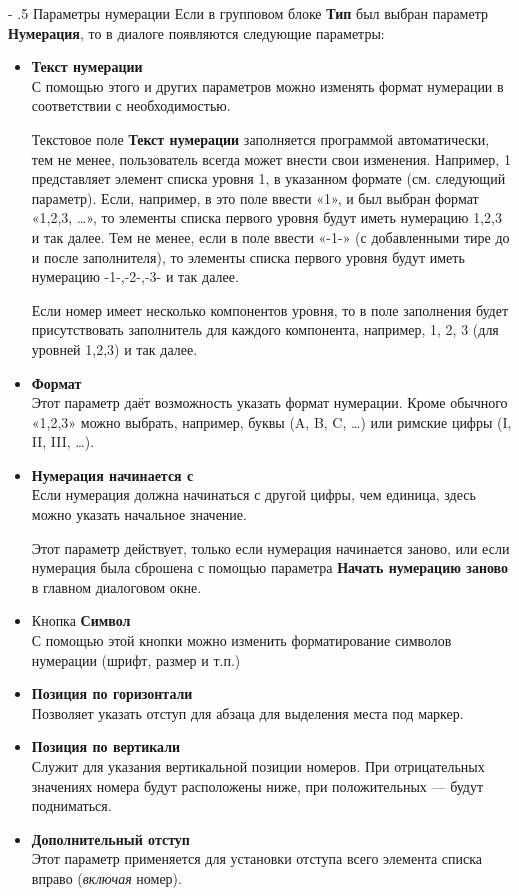 ﻿\documentclass[a4paper,10pt]{article}
\makeatletter
\renewcommand\paragraph{%
   \@startsection{paragraph}{4}{0mm}%
      {-\baselineskip}%
      {.5\baselineskip}%
      {\normalfont\normalsize\bfseries}}
\makeatother
\begin{document}
\paragraph{Параметры нумерации}
Если в групповом блоке \textbf{Тип} был выбран параметр \textbf{Нумерация}, то в диалоге появляются следующие параметры:
\begin{itemize}
 \item \textbf{Текст нумерации}\\
 С помощью этого и других параметров можно изменять формат нумерации в соответствии с необходимостью.
 
 Текстовое поле \textbf{Текст нумерации} заполняется программой автоматически, тем не менее, пользователь всегда может внести свои изменения. Например, {1} представляет элемент списка уровня 1, в указанном формате (см. следующий параметр). Если, например, в это поле ввести «{1}», и был выбран формат «1,2,3, …», то элементы списка первого уровня будут иметь нумерацию 1,2,3 и так далее. Тем не менее, если в поле ввести «-{1}-» (с добавленными тире до и после заполнителя), то элементы списка первого уровня будут иметь нумерацию -1-,-2-,-3- и так далее.
 
 Если номер имеет несколько компонентов уровня, то в поле заполнения будет присутствовать заполнитель для каждого компонента, например, {1}, {2}, {3} (для уровней 1,2,3) и так далее.
 \item \textbf{Формат}\\
 Этот параметр даёт возможность указать формат нумерации. Кроме обычного «1,2,3» можно выбрать, например, буквы (A, B, C, …) или римские цифры (I, II, III, …).
 \item \textbf{Нумерация начинается с}\\
 Если нумерация должна начинаться с другой цифры, чем единица, здесь можно указать начальное значение.
 
 Этот параметр действует, только если нумерация начинается заново, или если нумерация была сброшена с помощью параметра \textbf{Начать нумерацию заново} в главном диалоговом окне.
 \item Кнопка \textbf{Символ}\\
 С помощью этой кнопки можно изменить форматирование символов нумерации (шрифт, размер и т.п.)
 \item \textbf{Позиция по горизонтали}\\
 Позволяет указать отступ для абзаца для выделения места под маркер.
 \item \textbf{Позиция по вертикали}\\
 Служит для указания вертикальной позиции номеров. При отрицательных значениях номера будут расположены ниже, при положительных — будут подниматься.
 \item \textbf{Дополнительный отступ}\\
 Этот параметр применяется для установки отступа всего элемента списка вправо (\textit{включая} номер).
\end{itemize}
\end{document}
